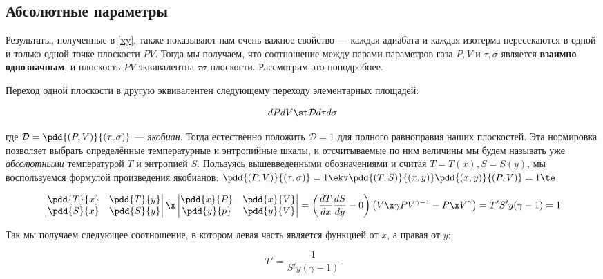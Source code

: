 \documentclass[12pt]{kiarticle}
\newcommand{\D}{\ensuremath{\mathcal{D}}}
\begin{document}
\subsection{Абсолютные параметры}

Результаты, полученные в \eqref{xy}, также показывают нам очень важное свойство --- каждая адиабата и каждая изотерма пересекаются в одной и только одной точке плоскости $ PV $. Тогда мы получаем, что соотношение между парами параметров газа $ P, V $ и $ \tau, \sigma $ является \textbf{взаимно однозначным}, и плоскость $ PV $  эквивалентна $ \tau \sigma $-плоскости. Рассмотрим это поподробнее.

Переход одной плоскости в другую эквивалентен следующему переходу элементарных площадей: 

\begin{equation}\label{D}
dP dV \st \D d\tau d\sigma
\end{equation}

где $ \D  = \pdd{(P, V)}{(\tau, \sigma)} $ --- \textit{якобиан}. Тогда естественно положить $ \D = 1 $ для полного равноправия наших плоскостей. Эта нормировка позволяет выбрать определённые температурные и энтропийные шкалы, и отсчитываемые по ним величины мы будем называть уже \textit{абсолютными} температурой $ T $ и энтропией $ S $. Пользуясь вышевведенными обозначениями и считая $ T = T(x), S = S(y) $, мы воспользуемся формулой произведения якобианов: $  \pdd{(P, V)}{(\tau, \sigma)} = 1 \ekv  \pdd{(T, S)}{(x, y)} \pdd{(x, y)}{(P, V)} = 1 \te$

\begin{equation}\label{DD}
\begin{vmatrix}
\pdd{T}{x} & \pdd{T}{y} \\
\pdd{S}{x} & \pdd{S}{y} \\
\end{vmatrix} 
\x
\begin{vmatrix}
\pdd{x}{P} & \pdd{x}{V} \\
\pdd{y}{p} & \pdd{y}{V} \\
\end{vmatrix}
=
\left( \dfrac{dT}{dx} \dfrac{dS}{dy} - 0\right) \left( V\x \gamma PV^{\gamma - 1} - P\x V^\gamma\right) = T' S' y(\gamma - 1) = 1
\end{equation}

Так мы получаем следующее соотношение, в котором левая часть является функцией от $ x $, а правая от $ y $:

\begin{equation}\label{T'S'}
T' = \dfrac{1}{S'y(\gamma - 1)}
\end{equation}
\end{document}
